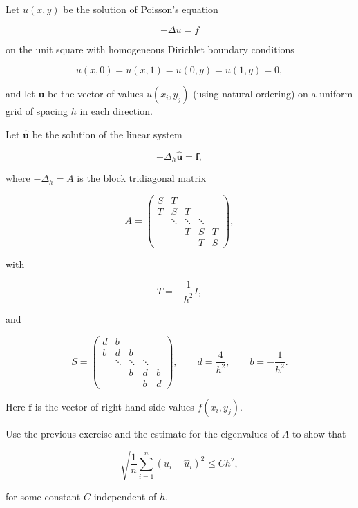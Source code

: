 \documentclass{ctexart}
\begin{document}
\begin{problem}\label{pro:2}

  Let $u(x,y)$ be the solution of Poisson's equation

  \[
    -\Delta u = f
  \]

  on the unit square with homogeneous Dirichlet boundary conditions

  \[
    u(x,0)=u(x,1)=u(0,y)=u(1,y)=0,
  \]

  and let $\mathbf{u}$ be the vector of values
  $u(x_i,y_j)$ (using natural ordering) on a uniform grid of spacing
  $h$ in each direction.

  Let $\hat{\mathbf{u}}$ be the solution of the linear system

  \[
    -\Delta_h \hat{\mathbf{u}} = \mathbf{f},
  \]

  where $-\Delta_h=A$ is the block tridiagonal matrix

  \[
    A=
    \begin{pmatrix}
      S & T &   &   &   \\
      T & S & T &   &   \\
      & \ddots & \ddots & \ddots & \\
      &   & T & S & T \\
      &   &   & T & S
    \end{pmatrix},
  \]

  with

  \[
    T=-\frac1{h^2}I,
  \]

  and

  \[
    S=
    \begin{pmatrix}
      d & b &   &   &   \\
      b & d & b &   &   \\
      & \ddots & \ddots & \ddots & \\
      &   & b & d & b \\
      &   &   & b & d
    \end{pmatrix},
    \qquad
    d=\frac4{h^2},
    \qquad
    b=-\frac1{h^2}.
  \]

  Here $\mathbf{f}$ is the vector of right-hand-side values
  $f(x_i,y_j)$.

  Use the previous exercise and the estimate for the eigenvalues of $A$
  to show that

  \[
    \sqrt{
      \frac1n
      \sum_{i=1}^{n}
      \left(u_i-\hat{u}_i\right)^2
    }
    \le C h^2,
  \]

  for some constant $C$ independent of $h$.

\end{problem}
\end{document}

